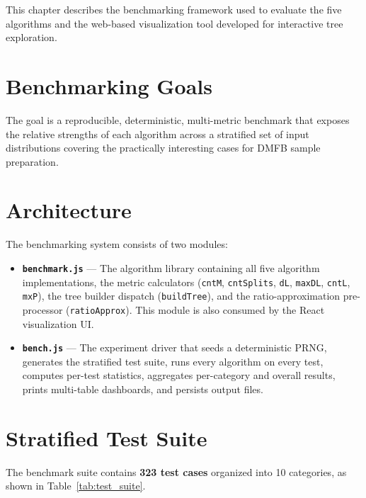 
This chapter describes the benchmarking framework used to evaluate the five algorithms and the web-based visualization tool developed for interactive tree exploration.

\section{Benchmarking Goals}

The goal is a reproducible, deterministic, multi-metric benchmark that exposes the relative strengths of each algorithm across a stratified set of input distributions covering the practically interesting cases for DMFB sample preparation.

\section{Architecture}

The benchmarking system consists of two modules:

\begin{itemize}
    \item \textbf{\texttt{benchmark.js}} --- The algorithm library containing all five algorithm implementations, the metric calculators (\texttt{cntM}, \texttt{cntSplits}, \texttt{dL}, \texttt{maxDL}, \texttt{cntL}, \texttt{mxP}), the tree builder dispatch (\texttt{buildTree}), and the ratio-approximation pre-processor (\texttt{ratioApprox}). This module is also consumed by the React visualization UI.
    
    \item \textbf{\texttt{bench.js}} --- The experiment driver that seeds a deterministic PRNG, generates the stratified test suite, runs every algorithm on every test, computes per-test statistics, aggregates per-category and overall results, prints multi-table dashboards, and persists output files.
\end{itemize}

\section{Stratified Test Suite}

The benchmark suite contains \textbf{323 test cases} organized into 10 categories, as shown in Table~\ref{tab:test_suite}.

